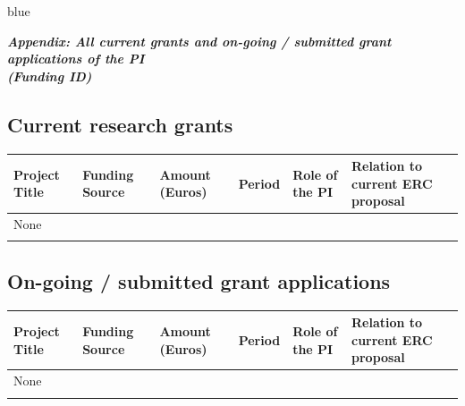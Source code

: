 \documentclass[11pt,a4paper]{article}
\newenvironment{b2}{\begin{color}{blue}}{\end{color}}
\begin{document}
\begin{b2}\newpage
	\begin{center}
		\Large \emph{
			\textbf{Appendix: All current grants and on-going / submitted grant applications of the PI \\
				(Funding ID)}
		}
	\end{center}
	
	
	\subsection*{Current research grants}
	\begin{tabularx}{\textwidth}{|X|X|X|X|m{2.5cm}|m{5cm}|}
		\hline\rowcolor{gray!30}
		\textbf{Project Title} & \textbf{Funding Source} & \textbf{Amount (Euros)} & \textbf{Period} & \textbf{Role of the PI} & \textbf{Relation to current ERC proposal} \\
		\hline
		None & & & & & \\\hline
		 & & & & & \\\hline
	\end{tabularx}
	
	\vspace{1cm}
	
	\subsection*{On-going / submitted grant applications}
	\begin{tabularx}{\textwidth}{|X|X|X|X|m{2.5cm}|m{5cm}|}
		\hline\rowcolor{gray!30}
		\textbf{Project Title} & \textbf{Funding Source} & \textbf{Amount (Euros)} & \textbf{Period} & \textbf{Role of the PI} & \textbf{Relation to current ERC proposal} \\
		\hline
		None & & & & & \\\hline
		 & & & & & \\\hline
	\end{tabularx}
\end{b2}
\end{document}
